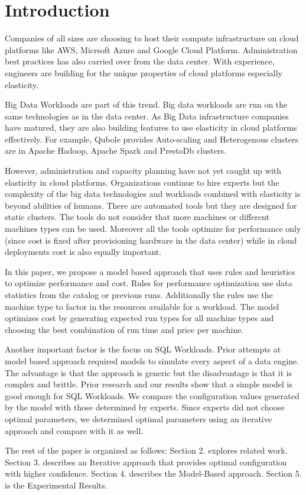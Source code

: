 \section{Introduction}

Companies of all sizes are choosing to host their compute infrastructure on cloud platforms like AWS, Micrsoft Azure and Google Cloud Platform. 
Administration best practices has also carried over from the data center. With experience, engineers are building for the unique properties
of cloud platforms especially elasticity. 

Big Data Workloads are part of this trend. Big data workloads are run on the same technologies as in the data center. As Big Data infrastructure
companies have matured, they are also building features to use elasticity in cloud platforms effectively. For example, Qubole provides Auto-scaling 
and Heterogenous clusters are in Apache Hadoop, Apache Spark and PrestoDb clusters. 

However, administration and capacity planning have not yet caught up with elasticity in cloud platforms. Organizations continue to hire experts but the 
complexity of the big data technologies and workloads combined with elasticity is beyond abilities of humans. There are automated tools but they are 
designed for static clusters. The tools do not consider that more machines or different machines types can be used. Moreover all the tools optimize
for performance only (since cost is fixed after provisioning hardware in the data center) while in cloud deployments cost is also equally important. 

In this paper, we propose a model based approach that uses rules and heuristics to optimize performance and cost. Rules for performance optimization
use data statistics from the catalog or previous runs. Additionally the rules use the machine type to factor in the resources available for a workload.
The model optimizes cost by generating expected run types for all machine types and choosing the best combination of run time and price per machine.

Another important factor is the focus on SQL Workloads. Prior attempts at model based approach required models to simulate every aspect of a 
data engine. The advantage is that the approach is generic but the disadvantage is that it is complex and brittle. Prior research and our results
show that a simple model is good enough for SQL Workloads. We compare the configuration values generated by the model with those determined by experts.
Since experts did not choose optimal parameters, we determined optimal parameters using an iterative approach and compare with it as well.

The rest of the paper is organized as follows: Section 2. explores related work. Section 3. describes an Iterative approach that provides optimal 
configuration with higher confidence. Section 4. describes the Model-Based approach. Section 5. is the Experimental Results.

